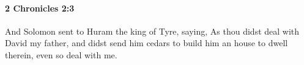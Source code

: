 
		\paragraph{2 Chronicles 2:3} %
			\label{2CHRONICLES-2-3}

			And Solomon sent to Huram the king of Tyre, saying, As thou didst deal with David my father, and didst send him cedars to build him an house to dwell therein, even so deal with me.



